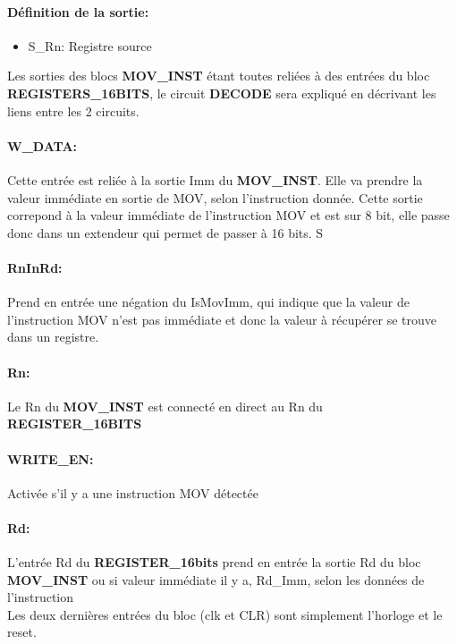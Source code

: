 \documentclass[a4paper]{article} %
\begin{document}
\paragraph{Définition de la sortie:}
\begin{itemize}
    \item     S\_Rn: Registre source
\end{itemize}
\medskip
Les sorties des blocs \textbf{MOV\_INST} étant toutes reliées à des entrées du bloc \textbf{REGISTERS\_16BITS}, le circuit \textbf{DECODE} sera expliqué en décrivant les liens entre les 2 circuits.\\

\paragraph{W\_DATA:} 
Cette entrée est reliée à la sortie Imm du \textbf{MOV\_INST}. Elle va prendre la valeur immédiate en sortie de MOV, selon l'instruction donnée. Cette sortie correpond à la valeur immédiate de l'instruction MOV et est sur 8 bit, elle passe donc dans un extendeur qui permet de passer à 16 bits. S

\paragraph{RnInRd:} 
Prend en entrée une négation du IsMovImm, qui indique que la valeur de l'instruction MOV n'est pas immédiate et donc la valeur à récupérer se trouve dans un registre.

\paragraph{Rn:}
Le Rn du \textbf{MOV\_INST} est connecté en direct au Rn du \textbf{REGISTER\_16BITS}

\paragraph{WRITE\_EN:}
Activée s'il y a une instruction MOV détectée

\paragraph{Rd:}
L'entrée Rd du \textbf{REGISTER\_16bits} prend en entrée la sortie Rd du bloc \textbf{MOV\_INST} ou si valeur immédiate il y a, Rd\_Imm, selon les données de l'instruction\\

Les deux dernières entrées du bloc (clk et CLR) sont simplement l'horloge et le reset.
\end{document}
